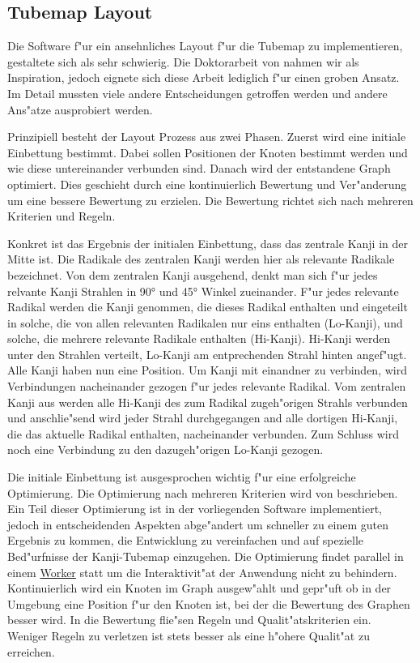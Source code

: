 \subsection{Tubemap Layout}

Die Software f"ur ein ansehnliches Layout f"ur die Tubemap zu
implementieren, gestaltete sich als sehr schwierig. Die Doktorarbeit von
\cite{automaticlayoutmetro08} nahmen wir als Inspiration, jedoch eignete
sich diese Arbeit lediglich f"ur einen groben Ansatz. Im Detail mussten
viele andere Entscheidungen getroffen werden und andere Ans"atze
ausprobiert werden.

Prinzipiell besteht der Layout Prozess aus zwei Phasen. Zuerst wird eine
initiale Einbettung bestimmt. Dabei sollen Positionen der Knoten
bestimmt werden und wie diese untereinander verbunden sind. Danach wird
der entstandene Graph optimiert. Dies geschieht durch eine
kontinuierlich Bewertung und Ver"anderung um eine bessere Bewertung zu
erzielen. Die Bewertung richtet sich nach mehreren Kriterien und Regeln.

Konkret ist das Ergebnis der initialen Einbettung, dass das zentrale
Kanji in der Mitte ist. Die Radikale des zentralen Kanji werden hier als
relevante Radikale bezeichnet. Von dem zentralen Kanji ausgehend, denkt
man sich f"ur jedes relvante Kanji Strahlen in 90° und 45° Winkel
zueinander. F"ur jedes relevante Radikal werden die Kanji genommen, die
dieses Radikal enthalten und eingeteilt in solche, die von allen
relevanten Radikalen nur eins enthalten (Lo-Kanji), und solche, die
mehrere relevante Radikale enthalten (Hi-Kanji). Hi-Kanji werden unter
den Strahlen verteilt, Lo-Kanji am entprechenden Strahl hinten
angef"ugt. Alle Kanji haben nun eine Position. Um Kanji mit einandner
zu verbinden, wird Verbindungen nacheinander gezogen f"ur jedes relevante
Radikal. Vom zentralen Kanji aus werden alle Hi-Kanji des zum Radikal
zugeh"origen Strahls verbunden und anschlie"send wird jeder Strahl
durchgegangen and alle dortigen Hi-Kanji, die das aktuelle Radikal
enthalten, nacheinander verbunden. Zum Schluss wird noch eine Verbindung
zu den dazugeh"origen Lo-Kanji gezogen.

Die initiale Einbettung ist ausgesprochen wichtig f"ur eine erfolgreiche
Optimierung. Die Optimierung nach mehreren Kriterien wird von
\cite{automaticmetromap11} beschrieben. Ein Teil dieser Optimierung ist
in der vorliegenden Software implementiert, jedoch in entscheidenden
Aspekten abge"andert um schneller zu einem guten Ergebnis zu kommen, die
Entwicklung zu vereinfachen und auf spezielle Bed"urfnisse der
Kanji-Tubemap einzugehen. Die Optimierung findet parallel in einem
\href{http://www.whatwg.org/specthes/web-apps/current-work/multipage/workers.html}{Worker}
statt um die Interaktivit"at der Anwendung nicht zu behindern.
Kontinuierlich wird ein Knoten im Graph ausgew"ahlt und gepr"uft ob in der
Umgebung eine Position f"ur den Knoten ist, bei der die Bewertung des
Graphen besser wird. In die Bewertung flie"sen Regeln und
Qualit"atskriterien ein. Weniger Regeln zu verletzen ist stets besser als
eine h"ohere Qualit"at zu erreichen.

